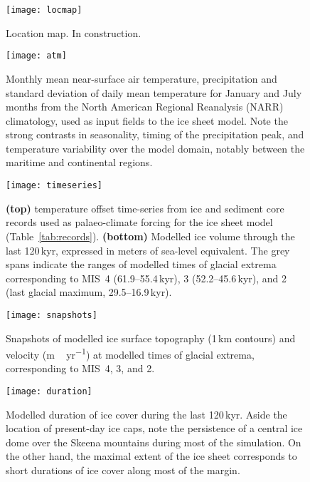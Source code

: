 \begin{figure}
  \texttt{[image: locmap]}
  \caption{Location map. In construction.}
  \label{fig:locmap}
\end{figure}

\begin{figure}
  \texttt{[image: atm]}
  \caption{Monthly mean near-surface air temperature, precipitation and
           standard deviation of daily mean temperature for January and July
           months from the North American Regional Reanalysis (NARR)
           climatology, used as input fields to the ice sheet model. Note the
           strong contrasts in seasonality, timing of the precipitation peak,
           and temperature variability over the model domain, notably between
           the maritime and continental regions.}
  \label{fig:atm}
\end{figure}

\begin{figure}
  \texttt{[image: timeseries]}
  \caption{\textbf{(top)} temperature offset time-series from ice and sediment
           core records used as palaeo-climate forcing for the ice sheet model
           (Table~\ref{tab:records}). \textbf{(bottom)} Modelled ice volume
           through the last 120\,\unit{kyr}, expressed in meters of sea-level
           equivalent. The grey spans indicate the ranges of modelled times of
           glacial extrema corresponding to MIS~4 (61.9--55.4\,\unit{kyr}), 3
           (52.2--45.6\,\unit{kyr}), and 2 (last glacial maximum,
           29.5--16.9\,\unit{kyr}).
           }
  \label{fig:timeseries}
\end{figure}

\begin{figure}
  \texttt{[image: snapshots]}
  \caption{Snapshots of modelled ice surface topography (1\,\unit{km} contours)
           and velocity (\unit{m\,yr^{-1}}) at modelled times of glacial
           extrema, corresponding to MIS~4, 3, and 2.}
  \label{fig:snapshots}
\end{figure}

\begin{figure}
  \texttt{[image: duration]}
  \caption{Modelled duration of ice cover during the last 120\,\unit{kyr}.
           Aside the location of present-day ice caps, note the persistence of
           a central ice dome over the Skeena mountains during most of the
           simulation. On the other hand, the maximal extent of the ice sheet
           corresponds to short durations of ice cover along most of the
           margin.
           }
  \label{fig:duration}
\end{figure}

